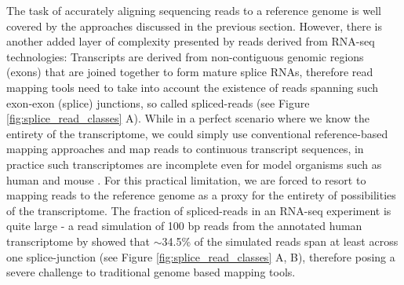 The task of accurately aligning sequencing reads to a reference genome is well covered by the approaches discussed in the previous section. However, there is another added layer of complexity presented by reads derived from RNA-seq technologies: Transcripts are derived from non-contiguous genomic regions (exons) that are joined together to form mature splice RNAs, therefore read mapping tools need to take into account the existence of reads spanning such exon-exon (splice) junctions, so called spliced-reads \citep{Garber2011} (see Figure \ref{fig:splice_read_classes} A). While in a perfect scenario where we know the entirety of the transcriptome, we could simply use conventional reference-based mapping approaches and map reads to continuous transcript sequences, in practice such transcriptomes are incomplete even for model organisms such as human and mouse \citep{Trapnell2009}. For this practical limitation, we are forced to resort to mapping reads to the reference genome as a proxy for the entirety of possibilities of the transcriptome. The fraction of spliced-reads in an RNA-seq experiment is quite large - a read simulation of 100 bp reads from the annotated human transcriptome by \citeauthor{Kim2015} \citep{Kim2015} showed that $\sim$34.5\% of the simulated reads span at least across one splice-junction (see Figure \ref{fig:splice_read_classes} A, B), therefore posing a severe challenge to traditional genome based mapping tools.

